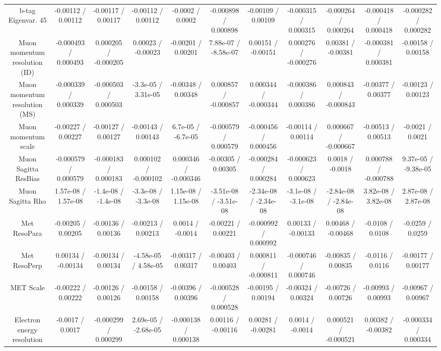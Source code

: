 \begin{table}[htbp]
\begin{center}
\begin{tabular}{|c|c|c|c|c|c|c|c|c|c|c|}
  b-tag Eigenvar. 45 & -0.00112 / 0.00112 & -0.00117 / 0.00117 & -0.00112 / 0.00112 & -0.0002 / 0.0002 & -0.000898 / 0.000898 & -0.00109 / 0.00109 & -0.000315 / 0.000315 & -0.000264 / 0.000264 & -0.000418 / 0.000418 & -0.000282 / 0.000282 \\ 
  Muon momentum resolution (ID) & -0.000493 / 0.000493 & 0.000205 / -0.000205 & 0.00023 / -0.00023 & -0.00201 / 0.00201 & 7.88e-07 / -8.58e-07 & 0.00151 / -0.00151 & 0.000276 / -0.000276 & 0.00381 / -0.00381 & -0.000381 / 0.000381 & -0.00158 / 0.00158 \\ 
  Muon momentum resolution (MS) & -0.000339 / 0.000339 & -0.000503 / 0.000503 & -3.3e-05 / 3.31e-05 & -0.00348 / 0.00348 & 0.000857 / -0.000857 & 0.000344 / -0.000344 & -0.000386 / 0.000386 & 0.000843 / -0.000843 & -0.00377 / 0.00377 & -0.00123 / 0.00123 \\ 
  Muon momentum scale & -0.00227 / 0.00227 & -0.00127 / 0.00127 & -0.00143 / 0.00143 & 6.7e-05 / -6.7e-05 & -0.000579 / 0.000579 & -0.000456 / 0.000456 & -0.00114 / 0.00114 & 0.000667 / -0.000667 & -0.00513 / 0.00513 & -0.0021 / 0.0021 \\ 
  Muon Sagitta ResBias & -0.000579 / 0.000579 & -0.000183 / 0.000183 & 0.000102 / -0.000102 & 0.000346 / -0.000346 & -0.00305 / 0.00305 & -0.000284 / 0.000284 & -0.000623 / 0.000623 & 0.0018 / -0.0018 & 0.000788 / -0.000788 & 9.37e-05 / -9.38e-05 \\ 
  Muon Sagitta Rho & 1.57e-08 / 1.57e-08 & -1.4e-08 / -1.4e-08 & -3.3e-08 / -3.3e-08 & 1.15e-08 / 1.15e-08 & -3.51e-08 / -3.51e-08 & -2.34e-08 / -2.34e-08 & -3.1e-08 / -3.1e-08 & -2.84e-08 / -2.84e-08 & 3.82e-08 / 3.82e-08 & 2.87e-08 / 2.87e-08 \\ 
  Met ResoPara & -0.00205 / 0.00205 & -0.00136 / 0.00136 & -0.00213 / 0.00213 & 0.0014 / -0.0014 & -0.00221 / 0.00221 & -0.000992 / 0.000992 & 0.00133 / -0.00133 & 0.00468 / -0.00468 & -0.0108 / 0.0108 & -0.0259 / 0.0259 \\ 
  Met ResoPerp & 0.00134 / -0.00134 & -0.00134 / 0.00134 & -4.58e-05 / 4.58e-05 & -0.00317 / 0.00317 & -0.00403 / 0.00403 & 0.000811 / -0.000811 & -0.000746 / 0.000746 & -0.00835 / 0.00835 & -0.0116 / 0.0116 & -0.00177 / 0.00177 \\ 
  MET Scale & -0.00222 / 0.00222 & -0.00126 / 0.00126 & -0.00158 / 0.00158 & -0.00396 / 0.00396 & -0.000528 / 0.000528 & -0.00195 / 0.00194 & -0.00324 / 0.00324 & -0.00726 / 0.00726 & -0.00993 / 0.00993 & -0.00967 / 0.00967 \\ 
  Electron energy resolution & -0.0017 / 0.0017 & -0.000299 / 0.000299 & 2.69e-05 / -2.68e-05 & -0.000138 / 0.000138 & 0.00116 / -0.00116 & 0.00281 / -0.00281 & 0.0014 / -0.0014 & 0.000521 / -0.000521 & 0.00382 / -0.00382 & -0.000334 / 0.000334 \\ 

\end{tabular}
\end{center}
\end{table}
